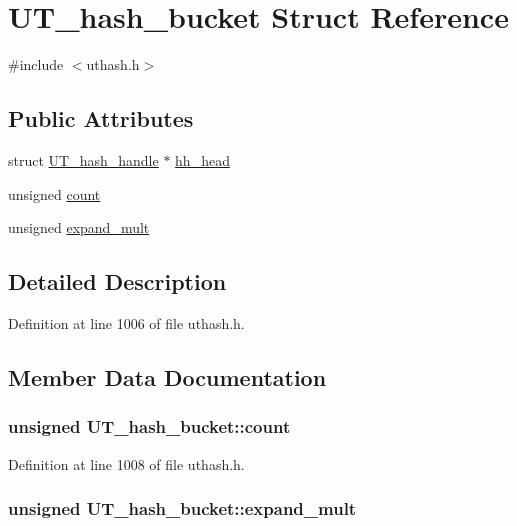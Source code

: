 \hypertarget{struct_u_t__hash__bucket}{\section{U\-T\-\_\-hash\-\_\-bucket Struct Reference}
\label{struct_u_t__hash__bucket}
}


{\ttfamily \#include $<$uthash.\-h$>$}

\subsection*{Public Attributes}
\begin{DoxyCompactItemize}
\item 
struct \hyperlink{struct_u_t__hash__handle}{U\-T\-\_\-hash\-\_\-handle} $\ast$ \hyperlink{struct_u_t__hash__bucket_aff0ef60d2d1fabbfdd092b1ae9d00422}{hh\-\_\-head}
\item 
unsigned \hyperlink{struct_u_t__hash__bucket_a5d20cc12bdcbde360398910eefb45634}{count}
\item 
unsigned \hyperlink{struct_u_t__hash__bucket_a9b739c1b69c141e8198c0c64af643b2b}{expand\-\_\-mult}
\end{DoxyCompactItemize}


\subsection{Detailed Description}


Definition at line 1006 of file uthash.\-h.



\subsection{Member Data Documentation}
\hypertarget{struct_u_t__hash__bucket_a5d20cc12bdcbde360398910eefb45634}{
\subsubsection[{count}]{\setlength{\rightskip}{0pt plus 5cm}unsigned U\-T\-\_\-hash\-\_\-bucket\-::count}}\label{struct_u_t__hash__bucket_a5d20cc12bdcbde360398910eefb45634}


Definition at line 1008 of file uthash.\-h.

\hypertarget{struct_u_t__hash__bucket_a9b739c1b69c141e8198c0c64af643b2b}{
\subsubsection[{expand\-\_\-mult}]{\setlength{\rightskip}{0pt plus 5cm}unsigned U\-T\-\_\-hash\-\_\-bucket\-::expand\-\_\-mult}}\label{struct_u_t__hash__bucket_a9b739c1b69c141e8198c0c64af643b2b}


